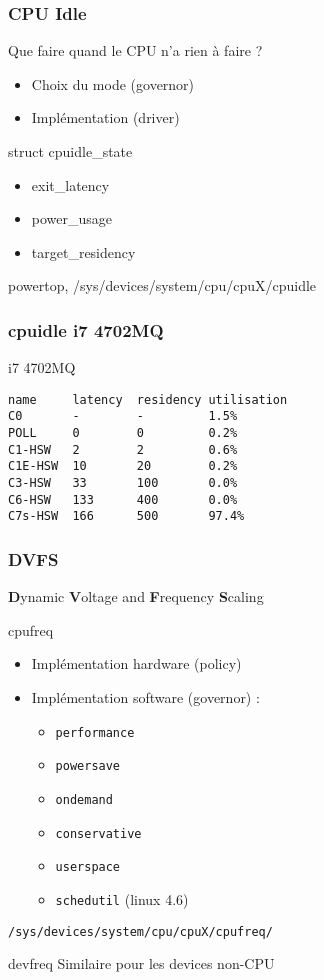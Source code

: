 \begin{frame}
	\frametitle{CPU Idle}
	\begin{block}{Que faire quand le CPU n'a rien à faire ?}
	\begin{itemize}
		\item Choix du mode (governor)
		\item Implémentation (driver)
	\end{itemize}
	\end{block}
	\begin{block}{struct cpuidle\_state}
		\begin{itemize}
			\item exit\_latency
			\item power\_usage
			\item target\_residency
		\end{itemize}
	\end{block}
		powertop, /sys/devices/system/cpu/cpuX/cpuidle
\end{frame}

\begin{frame}[fragile]
	\frametitle{cpuidle i7 4702MQ}
	\begin{block}{i7 4702MQ}
\begin{verbatim}
name     latency  residency utilisation
C0       -        -         1.5%
POLL     0        0         0.2%
C1-HSW   2        2         0.6%
C1E-HSW  10       20        0.2%
C3-HSW   33       100       0.0%
C6-HSW   133      400       0.0%
C7s-HSW  166      500       97.4%
\end{verbatim}
		\end{block}
\end{frame}

\begin{frame}
	\frametitle{DVFS}
	\textbf{D}ynamic \textbf{V}oltage and \textbf{F}requency \textbf{S}caling
	\begin{block}{cpufreq}
		\begin{itemize}
			\item Implémentation hardware (policy)
			\item Implémentation software (governor) :
				\begin{itemize}
					\item \texttt{performance}
					\item \texttt{powersave}
					\item \texttt{ondemand}
					\item \texttt{conservative}
					\item \texttt{userspace}
					\item \texttt{schedutil} (linux 4.6)
				\end{itemize}
		\end{itemize}
		\texttt{/sys/devices/system/cpu/cpuX/cpufreq/}
	\end{block}
	\begin{block}{devfreq}
		Similaire pour les devices non-CPU
	\end{block}
\end{frame}

